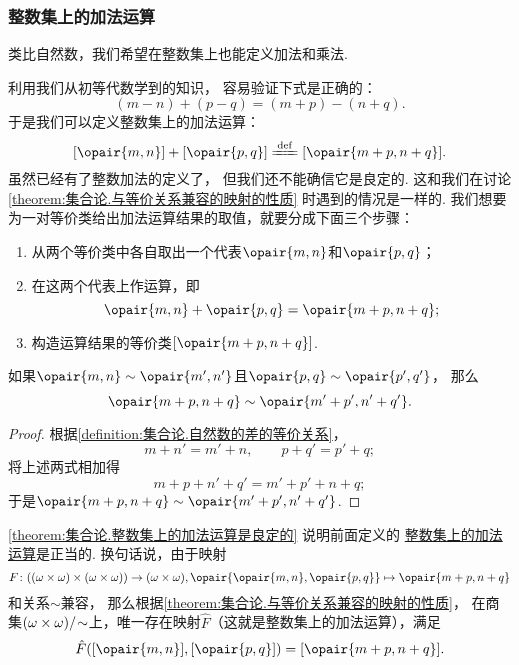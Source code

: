 \subsubsection{整数集上的加法运算}
类比自然数，我们希望在整数集上也能定义加法和乘法.

利用我们从初等代数学到的知识，
容易验证下式是正确的：\[
	(m-n)+(p-q) = (m+p)-(n+q).
\]
于是我们可以定义整数集上的加法运算：
\begin{equation}\label{equation:集合论.整数集上的加法运算}
	[\opair{m,n}] + [\opair{p,q}]
	\defeq
	[\opair{m+p,n+q}].
\end{equation}
虽然已经有了整数加法的定义了，
但我们还不能确信它是良定的.
这和我们在讨论\cref{theorem:集合论.与等价关系兼容的映射的性质} 时遇到的情况是一样的.
我们想要为一对等价类给出加法运算结果的取值，就要分成下面三个步骤：
\begin{enumerate}
	\item 从两个等价类中各自取出一个代表\(\opair{m,n}\)和\(\opair{p,q}\)；
	\item 在这两个代表上作运算，即\[
		\opair{m,n} + \opair{p,q}
		= \opair{m+p,n+q};
	\]
	\item 构造运算结果的等价类\([\opair{m+p,n+q}]\).
\end{enumerate}

\begin{lemma}\label{theorem:集合论.整数集上的加法运算是良定的}
如果\(\opair{m,n}\sim\opair{m',n'}\)且\(\opair{p,q}\sim\opair{p',q'}\)，
那么\[
	\opair{m+p,n+q}\sim\opair{m'+p',n'+q'}.
\]
\begin{proof}
根据\cref{definition:集合论.自然数的差的等价关系}，
\[
	m+n'=m'+n, \qquad
	p+q'=p'+q;
\]
将上述两式相加得\[
	m+p+n'+q'=m'+p'+n+q;
\]
于是\(\opair{m+p,n+q}\sim\opair{m'+p',n'+q'}\).
\end{proof}
\end{lemma}
\cref{theorem:集合论.整数集上的加法运算是良定的} 说明前面定义的%
\hyperref[equation:集合论.整数集上的加法运算]{整数集上的加法运算}是正当的.
换句话说，由于映射\[
	F\colon ((\omega\times\omega)\times(\omega\times\omega))\to(\omega\times\omega),
	\opair{\opair{m,n},\opair{p,q}} \mapsto \opair{m+p,n+q}
\]和关系\(\sim\)兼容，
那么根据\cref{theorem:集合论.与等价关系兼容的映射的性质}，
在商集\((\omega\times\omega)/\kern-2pt\sim\)上，唯一存在映射\(\hat{F}\)（这就是整数集上的加法运算），满足\[
	\hat{F}([\opair{m,n}],[\opair{p,q}]) = [\opair{m+p,n+q}].
\]

